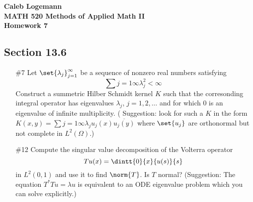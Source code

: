 \documentclass[11pt, oneside]{article}
\begin{document}
\noindent \textbf{\Large{Caleb Logemann \\
MATH 520 Methods of Applied Math II \\
Homework 7
}}

\subsection*{Section 13.6}
\begin{enumerate}
  \item[\#7]
    Let $\set{\lambda_j}_{j = 1}^{\infty}$ be a sequence of nonzero real
    numbers satisfying
    \[
      \sum{j = 1}{\infty}{\lambda_j^2} < \infty
    \]
    Construct a summetric Hilber Schmidt kernel $K$ such that the corresonding
    integral operator has eigenvalues $\lambda_j$, $j = 1, 2, \ldots$ and for
    which $0$ is an eigenvalue of infinite multiplicity.
    ( Suggestion: look for such a $K$ in the form
    $K(x, y) = \sum{j = 1}{\infty}{\lambda_j u_j(x) \overline{u_j(y)}}$ where
    $\set{u_j}$ are orthonormal but not complete in $L^2(\Omega)$.)

  \pagebreak
  \item[\#12]
    Compute the singular value decomposition of the Volterra operator
    \[
      Tu(x) = \dintt{0}{x}{u(s)}{s}
    \]
    in $L^2(0, 1)$ and use it to find $\norm{T}$.
    Is $T$ normal?
    (Suggestion: The equation $T^* T u = \lambda u$ is equivalent to an ODE
    eigenvalue problem which you can solve explicitly.)

\end{enumerate}

\pagebreak
\end{document}
